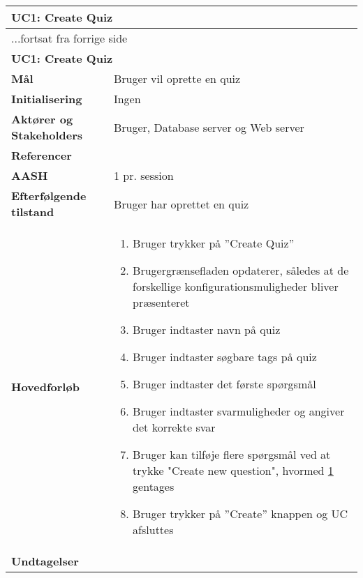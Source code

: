 \begin{center} \centering \label{ucCreateQuiz}
	\begin{longtable}{|p{4.6cm}|p{9.4cm}|}  %
	\hline
		\multicolumn{2}{|l|}{\textbf{UC1: Create Quiz}} \\\hline
		\endfirsthead
		
		\multicolumn{2}{l}{...fortsat fra forrige side} \\ \hline %
		\multicolumn{2}{|l|}{\textbf{UC1: Create Quiz}} \\\hline
		\endhead	
		
		\textbf{Mål}						&Bruger vil oprette en quiz
		\\\hline
		\textbf{Initialisering}			&Ingen
		\\\hline
		\textbf{Aktører og Stakeholders}	&Bruger, Database server og Web server
		\\\hline 
		\textbf{Referencer}				&%
		\\\hline
		\textbf{AASH}					&1 pr. session
		\\\hline
		\textbf{Efterfølgende tilstand}	&Bruger har oprettet en quiz
		\\\hline
		\textbf{Hovedforløb}					
			&\begin{enumerate}
				\item Bruger trykker på ''Create Quiz''
				\item Brugergrænsefladen opdaterer, således at de forskellige konfigurationsmuligheder bliver præsenteret
				\item Bruger indtaster navn på quiz
				\item Bruger indtaster søgbare tags på quiz
				\item \label{ucPunktLabelSpm} Bruger indtaster det første spørgsmål
				\item Bruger indtaster svarmuligheder og angiver det korrekte svar
				\item Bruger kan tilføje flere spørgsmål ved at trykke "Create new question", hvormed \ref{ucPunktLabelSpm} gentages
				\item Bruger trykker på ''Create'' knappen og UC afsluttes
				
			\end{enumerate}\\\hline
		\textbf{Undtagelser}
			&			
			\\\hline
	\end{longtable} 
\end{center}